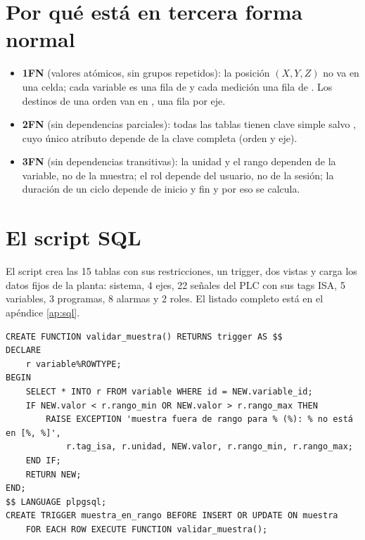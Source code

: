 \section{Por qué está en tercera forma normal}
\begin{itemize}
\item \textbf{1FN} (valores atómicos, sin grupos repetidos): la posición $(X, Y, Z)$ no va en una celda; cada variable es una fila de  y cada medición una fila de . Los destinos de una orden van en , una fila por eje.
\item \textbf{2FN} (sin dependencias parciales): todas las tablas tienen clave simple salvo , cuyo único atributo  depende de la clave completa (orden y eje).
\item \textbf{3FN} (sin dependencias transitivas): la unidad y el rango dependen de la variable, no de la muestra; el rol depende del usuario, no de la sesión; la duración de un ciclo depende de inicio y fin y por eso se calcula.
\end{itemize}

\section{El script SQL}
El script  crea las 15 tablas con sus restricciones, un trigger, dos vistas y carga los datos fijos de la planta: sistema, 4 ejes, 22 señales del PLC con sus tags ISA, 5 variables, 3 programas, 8 alarmas y 2 roles. El listado completo está en el apéndice \ref{ap:sql}.

\begin{lstlisting}[style=sql, caption={Trigger que rechaza muestras fuera de rango (lo pide la guía 1 para la Fase 2).}]
CREATE FUNCTION validar_muestra() RETURNS trigger AS $$
DECLARE
    r variable%ROWTYPE;
BEGIN
    SELECT * INTO r FROM variable WHERE id = NEW.variable_id;
    IF NEW.valor < r.rango_min OR NEW.valor > r.rango_max THEN
        RAISE EXCEPTION 'muestra fuera de rango para % (%): % no está en [%, %]',
            r.tag_isa, r.unidad, NEW.valor, r.rango_min, r.rango_max;
    END IF;
    RETURN NEW;
END;
$$ LANGUAGE plpgsql;
CREATE TRIGGER muestra_en_rango BEFORE INSERT OR UPDATE ON muestra
    FOR EACH ROW EXECUTE FUNCTION validar_muestra();
\end{lstlisting}

